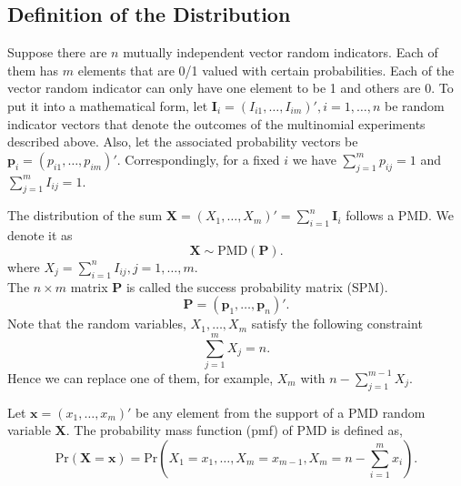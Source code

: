 \documentclass[12pt]{article}
\newcommand{\Ivec}{{\boldsymbol{I}}}
\newcommand{\Pmat}{\mathbf{P}}
\newcommand{\pvec}{\boldsymbol{p}}
\newcommand{\PMD}{\textrm{PMD}}
\newcommand{\Xvec}{\boldsymbol{X}}
\newcommand{\xvec}{\boldsymbol{x}}
\begin{document}
\subsection{Definition of the Distribution}
Suppose there are $n$ mutually independent vector random indicators. Each of them has $m$ elements that are 0/1 valued with certain probabilities. Each of the vector random indicator can only have one element to be 1 and others are 0. To put it into a mathematical form, let $\Ivec_{i} = (I_{i1}, \dots, I_{im})', i=1, \dots, n$ be random indicator vectors that denote the outcomes of the multinomial experiments described above. Also, let the associated probability vectors be $\pvec_{i} = (p_{i1}, \dots, p_{im})'$. Correspondingly, for a fixed $i$ we have $\sum_{j=1}^{m}p_{ij}=1$ and $\sum_{j=1}^{m}I_{ij}=1$.

 The distribution of the sum $\Xvec = (X_{1}, \dots, X_{m})'= \sum_{i=1}^{n}\Ivec_{i}$ follows a PMD. We denote it as
$$\Xvec \sim \PMD(\Pmat).$$ where $X_{j} = \sum_{i=1}^{n} I_{ij}, j=1,\dots,m$. \\
The $n \times m$ matrix $\Pmat$ is called the success probability matrix (SPM).
\begin{equation*}
\Pmat = (\pvec_{1}, \dots, \pvec_{n} )'.
\end{equation*}
Note that the random variables, $X_1, \dots, X_{m}$ satisfy the following constraint $$\sum_{j=1}^{m}X_{j} = n.$$ Hence we can replace one of them, for example, $X_m$ with $n-\sum_{j=1}^{m-1}X_j$.

Let $\xvec = (x_1,\dots,x_m)'$ be any element from the support of a $\PMD$ random variable $\Xvec$. The probability mass function (pmf) of PMD is defined as,
$$\text{Pr}(\Xvec=\xvec) = \text{Pr} \left( X_1 = x_1, \dots, X_m = x_{m-1}, X_{m} = n-\sum_{i=1}^{m}x_i \right).$$
\end{document}
